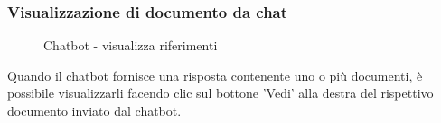 \documentclass[10pt, a4paper]{article}
\begin{document}
\subsubsection{Visualizzazione di documento da chat}
\begin{figure}[H]
    \centering  
    \caption{Chatbot - visualizza riferimenti}
\end{figure}
Quando il chatbot fornisce una risposta contenente uno o più documenti, è possibile visualizzarli facendo clic sul bottone 'Vedi' alla destra del rispettivo documento inviato dal chatbot.
\end{document}
